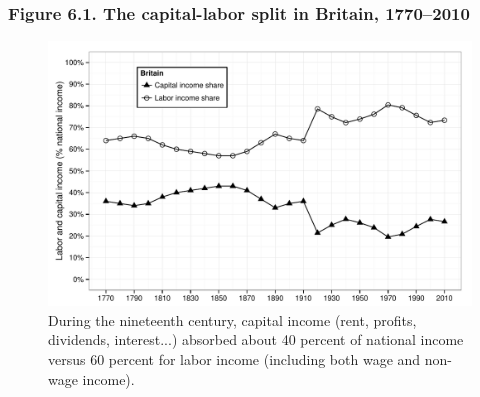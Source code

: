 \documentclass[t]{beamer}\usepackage[]{graphicx}\usepackage[]{color}
\newenvironment{knitrout}{}{} %
\begin{document}
\begin{frame}[label=Figure_6_1]
\frametitle{Figure 6.1. The capital-labor split in Britain, 1770--2010}
\begin{figure}[t]
\begin{minipage}[b]{\textwidth}
\centering
\begin{knitrout}\footnotesize
{}\color{fgcolor}

{\centering \includegraphics[width=1\linewidth]{figures/bw/Figure_6_1} 

}



\end{knitrout}
\caption{During the nineteenth century, capital income (rent, profits, dividends, interest...) absorbed about 40 percent of national income versus 60 percent for labor income (including both wage and non-wage income).}
\end{minipage}
\end{figure}
\end{frame}
\end{document}
